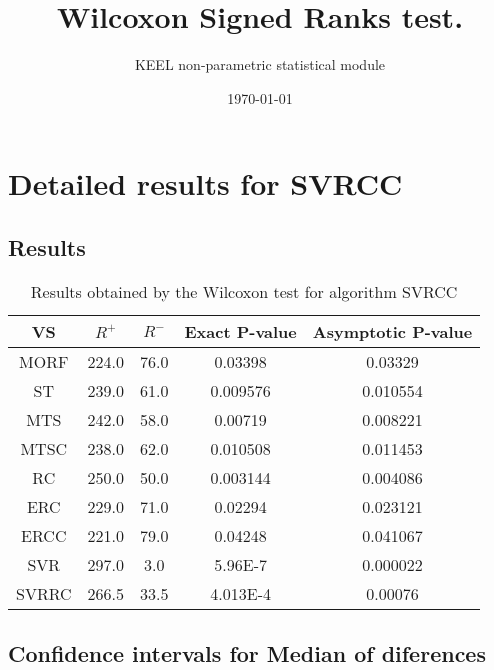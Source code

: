 \documentclass[a4paper,10pt]{article}
\title{Wilcoxon Signed Ranks test.}
\date{\today}
\author{KEEL non-parametric statistical module}
\begin{document}
\pagestyle{empty}
\maketitle
\thispagestyle{empty}



\section{Detailed results for SVRCC}


\subsection{Results}

\begin{table}[!htp]
\centering\small
\begin{tabular}{
|c|c|c|c|c|}
\hline
 VS & $R^{+}$ & $R^{-}$ & Exact P-value & Asymptotic P-value \\ \hline 
MORF & 224.0 & 76.0 & 0.03398 & 0.03329\\ \hline 
ST & 239.0 & 61.0 & 0.009576 & 0.010554\\ \hline 
MTS & 242.0 & 58.0 & 0.00719 & 0.008221\\ \hline 
MTSC & 238.0 & 62.0 & 0.010508 & 0.011453\\ \hline 
RC & 250.0 & 50.0 & 0.003144 & 0.004086\\ \hline 
ERC & 229.0 & 71.0 & 0.02294 & 0.023121\\ \hline 
ERCC & 221.0 & 79.0 & 0.04248 & 0.041067\\ \hline 
SVR & 297.0 & 3.0 & 5.96E-7 & 0.000022\\ \hline 
SVRRC & 266.5 & 33.5 & 4.013E-4 & 0.00076\\ \hline 

\end{tabular}
\caption{Results obtained by the Wilcoxon test for algorithm SVRCC}
\end{table}

\subsection{Confidence intervals for Median of diferences}
\end{document}
